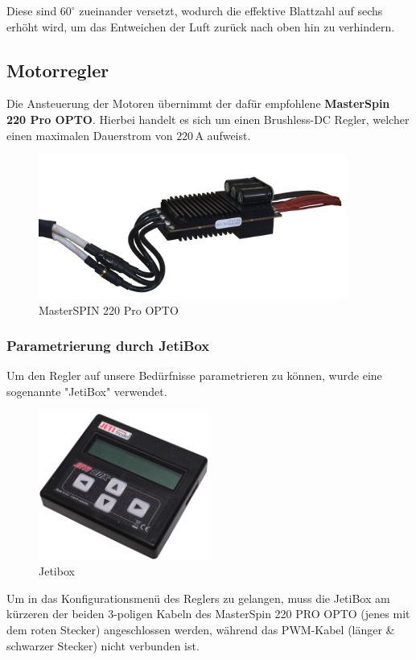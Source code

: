 Diese sind $60^\circ$ zueinander versetzt, wodurch die effektive Blattzahl auf sechs erhöht wird, 
um das Entweichen der Luft zurück nach oben hin zu verhindern.


\newpage

\subsection{Motorregler}
Die Ansteuerung der Motoren übernimmt der dafür empfohlene \textbf{MasterSpin 220 Pro OPTO}.
Hierbei handelt es sich um einen Brushless-DC Regler, welcher einen maximalen Dauerstrom von $220\,\mathrm{A}$ aufweist.
\begin{figure}[h]
    \centering
    \includegraphics[width=0.9\textwidth]{Fotos/MasterSpin_ohne_Halter.png}
    \caption{MasterSPIN 220 Pro OPTO}
\end{figure}
\subsubsection*{Parametrierung durch JetiBox}
Um den Regler auf unsere Bedürfnisse parametrieren zu können, wurde eine sogenannte "JetiBox" verwendet.
\begin{figure}[h]
    \centering
    \includegraphics[width=0.5\textwidth]{Fotos/JetiBox.png}
    \caption{Jetibox}
\end{figure}
\newpage
Um in das Konfigurationsmenü des Reglers zu gelangen, muss die JetiBox am kürzeren der beiden 3-poligen Kabeln des MasterSpin 220 PRO OPTO (jenes mit dem roten Stecker) angeschlossen werden, 
während das PWM-Kabel (länger \& schwarzer Stecker) nicht verbunden ist.\\

